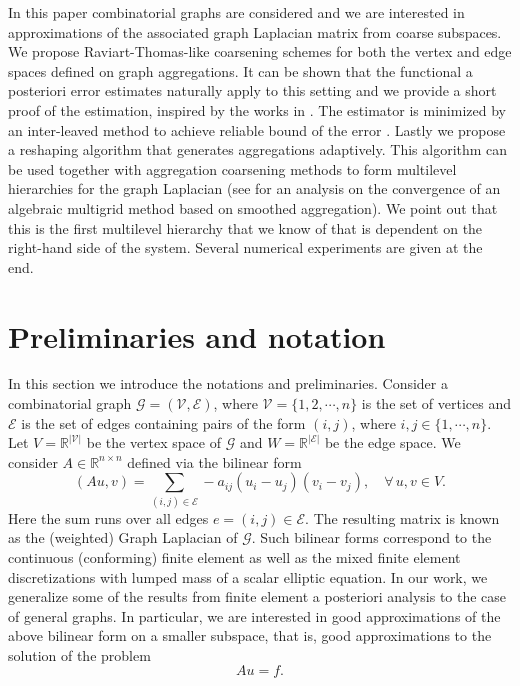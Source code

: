 \documentclass[ ]{elsarticle}
\newcommand{\cE}{\mathcal{E}}
\newcommand{\cG}{\mathcal{G}}
\newcommand{\cV}{\mathcal{V}}
\newcommand{\mforall}{\forall\,}
\newcommand{\vsp}{V}
\newcommand{\esp}{W}
\numberwithin{equation}{section}
\newcommand{\red}[1]{#1}
\begin{document}
In this paper combinatorial graphs are considered and we are
interested in approximations of the associated graph Laplacian matrix
from coarse subspaces. We propose Raviart-Thomas-like coarsening
schemes for both the vertex and edge spaces defined on graph
aggregations. It can be shown that the functional a posteriori error
estimates naturally apply to this setting and we provide a short proof
of the estimation, inspired by the works in \cite{1975Ladeveze,
  1999DestuynderMetivet, 1947PragerW_SyngeJ-aa, MR2458008}. The
estimator is minimized by an inter-leaved method to achieve reliable
bound of the error \cite{MR2817075}. Lastly we propose a reshaping
algorithm that generates aggregations adaptively. This algorithm can
be used together with aggregation coarsening methods \cite{MR1639073}
to form multilevel hierarchies for the graph Laplacian \red{(see
  \cite{MR1835471} for an analysis on the convergence of an algebraic
  multigrid method based on smoothed aggregation)}. We point out that
this is the first multilevel hierarchy that we know of that is
dependent on the right-hand side of the system. Several numerical
experiments are given at the end.


\section{Preliminaries and notation}
In this section we introduce the notations and preliminaries. Consider
a combinatorial graph $\cG = (\cV,\cE)$, where
$\cV = \{1,2,\cdots,n\}$ is the set of vertices and $\cE$ is the set
of edges containing pairs of the form $(i,j)$, where
$i,j\in\{1,\cdots,n\}$. Let $\vsp = \mathbb{R}^{\lvert\cV\rvert}$ be
the vertex space of $\cG$ and $\esp = \mathbb{R}^{\lvert\cE\rvert}$ be
the edge space. We consider $A\in \mathbb{R}^{n\times n}$ defined via
the bilinear form
\begin{equation*}
  (Au,v) = \sum_{(i,j)\in \cE}-a_{ij}(u_i-u_j)(v_i-v_j), \quad
  \mforall u,v\in \vsp.
\end{equation*}
Here the sum runs over all edges $e=(i,j)\in \cE$. The resulting
matrix is known as the (weighted) Graph Laplacian of $\cG$. Such
bilinear forms correspond to the continuous (conforming) finite
element as well as the mixed finite element discretizations with
lumped mass of a scalar elliptic equation. In our work, we generalize
some of the results from finite element a posteriori analysis to the
case of general graphs. In particular, we are interested in good
approximations of the above bilinear form on a smaller subspace, that
is, good approximations to the solution of the problem
\begin{equation}\label{eq:problem}
  Au = f.
\end{equation}
\end{document}

